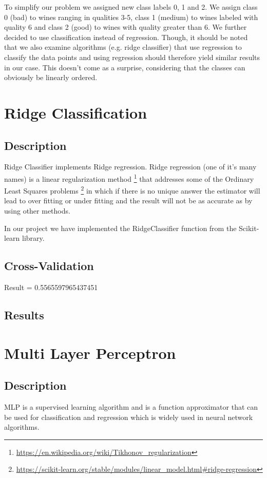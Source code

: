 \documentclass[twocolumn]{scrartcl}
\begin{document}
To simplify our problem we assigned new class labels 0, 1 and 2. We assign class 0 (bad) to wines ranging in qualities 3-5,
class 1 (medium) to wines labeled with quality 6 and class 2 (good) to wines with quality greater than 6.
We further decided to use classification instead of regression.
Though, it should be noted that we also examine algorithms (e.g. ridge classifier) that use regression to classify the data points
and using regression should therefore yield similar results in our case.
This doesn't come as a surprise, considering that the classes can obviously be linearly ordered.

\section{Ridge Classification}
\subsection{Description}
Ridge Classifier implements Ridge regression.
Ridge regression (one of it's many names) is a linear regularization method
\footnote{\url{https://en.wikipedia.org/wiki/Tikhonov_regularization}} 
that addresses some of the Ordinary Least Squares problems
\footnote{\url{https://scikit-learn.org/stable/modules/linear_model.html\#ridge-regression}}
in which if there is no unique answer the estimator will lead to over fitting or under fitting and the result will not be as accurate as by using other methods.

In our project we have implemented the RidgeClassifier function from the Scikit-learn library.
\subsection{Cross-Validation}
Result = 0.5565597965437451
\subsection{Results}

\section{Multi Layer Perceptron}
\subsection{Description}
MLP is a supervised learning algorithm and is a function approximator that can be used for classification and regression which is widely used in neural network algorithms. 
\end{document}
